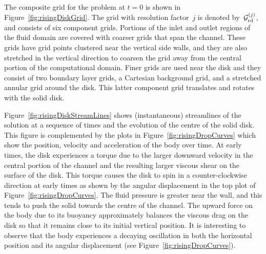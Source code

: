 The composite grid for the problem at $t=0$ is shown in Figure~\ref{fig:risingDiskGrid}.
The grid with resolution factor~$j$ is denoted by~${\mathcal G}_{\rm{rd}}^{(j)}$, and 
consists of six component grids. Portions of the inlet and outlet regions
of the fluid domain are covered with coarser grids that span the channel.
These grids have grid points clustered near the vertical side walls, and they are also stretched
in the vertical direction to coarsen the grid away from the central portion of the computational domain.
Finer grids are used near the disk and they consist of two boundary layer grids,
a Cartesian background grid, and a stretched annular grid around the disk.  This latter
component grid translates and rotates with the solid disk.



Figure~\ref{fig:risingDiskStreamLines} shows (instantaneous) streamlines of the solution at a sequence
of times and the evolution of the centre of the solid disk.  This figure is complemented by the plots in Figure~\ref{fig:risingDropCurves} which show the position, velocity and acceleration of the body over time.
At early times, the disk experiences a torque due to the larger downward velocity in the central portion of the channel
and the resulting larger viscous shear on the surface of the disk.  This torque causes the disk to spin in a
counter-clockwise direction at early times as shown by the angular displacement in the top plot of Figure~\ref{fig:risingDropCurves}.  The fluid pressure is greater near the wall, and this tends to push the solid towards
the centre of the channel.  The upward force on the body due to its buoyancy approximately balances the viscous drag on
the disk so that it remains close to its initial vertical position.  It is interesting to observe that the body
experiences a decaying oscillation in both the horizontal position and its angular displacement (see Figure~\ref{fig:risingDropCurves}).



